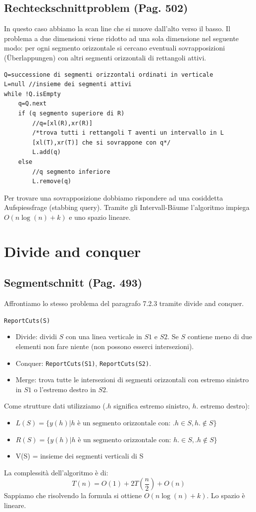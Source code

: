 \documentclass[a4paper]{book}
\newcommand{\inline}[1]{\lstinline!#1!}%
\newcommand{\lstIndent}{4}
\begin{document}
\subsection{Rechteckschnittproblem (Pag. 502)}
In questo caso abbiamo la scan line che si muove dall'alto verso il basso. Il problema a due dimensioni viene ridotto ad una sola dimensione nel seguente modo: per ogni segmento orizzontale si cercano eventuali sovrapposizioni (Überlappungen) con altri segmenti orizzontali di rettangoli attivi.
\begin{lstlisting}[tabsize=\lstIndent]
Q=successione di segmenti orizzontali ordinati in verticale
L=null //insieme dei segmenti attivi
while !Q.isEmpty
	q=Q.next
	if (q segmento superiore di R)
		//q=[xl(R),xr(R)]
		/*trova tutti i rettangoli T aventi un intervallo in L
		[xl(T),xr(T)] che si sovrappone con q*/
		L.add(q)
	else
		//q segmento inferiore
		L.remove(q)			
\end{lstlisting}
Per trovare una sovrapposizione dobbiamo rispondere ad una cosiddetta Aufspiessfrage (stabbing query). Tramite gli Intervall-Bäume l'algoritmo impiega $O(n \log(n)+k)$ e uno spazio lineare.

\section{Divide and conquer}
\subsection{Segmentschnitt (Pag. 493)}
Affrontiamo lo stesso problema del paragrafo 7.2.3 tramite divide and conquer.

\inline{ReportCuts(S)}
\begin{itemize}
\item Divide: dividi $S$ con una linea verticale in $S1$ e $S2$. Se $S$ contiene meno di due elementi non fare niente (non possono esserci intersezioni).
\item Conquer: \inline{ReportCuts(S1)}, \inline{ReportCuts(S2)}.
\item Merge: trova tutte le intersezioni di segmenti orizzontali con estremo sinistro in $S1$ o l'estremo destro in $S2$.
\end{itemize}
Come strutture dati utilizziamo ($.h$ significa estremo sinistro, $h.$ estremo destro):
\begin{itemize}
\item $L(S) = \{y(h)|\mbox{$h$ è un segmento orizzontale con: } .h\in S, h.\not  \in S\}$
\item $R(S) = \{y(h)|\mbox{$h$ è un segmento orizzontale con: } h.\in S, .h\not  \in S\}$
\item V(S) = insieme dei segmenti verticali di S
\end{itemize}
La complessità dell'algoritmo è di:
$$T(n)=O(1)+2T\left(\frac{n}{2}\right)+O(n)$$
Sappiamo che risolvendo la formula si ottiene $O(n \log(n)+k)$. Lo spazio è lineare.
\end{document}
